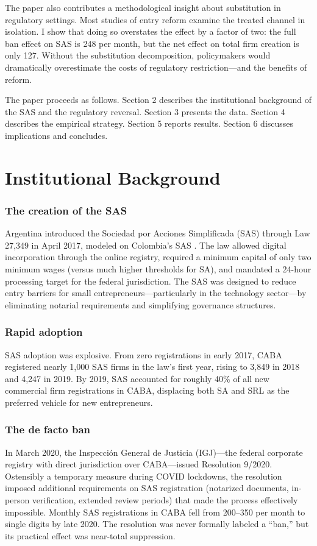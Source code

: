 \documentclass[12pt]{article}
\begin{document}
The paper also contributes a methodological insight about substitution in regulatory settings. Most studies of entry reform examine the treated channel in isolation. I show that doing so overstates the effect by a factor of two: the full ban effect on SAS is 248 per month, but the net effect on total firm creation is only 127. Without the substitution decomposition, policymakers would dramatically overestimate the costs of regulatory restriction---and the benefits of reform.

The paper proceeds as follows. Section 2 describes the institutional background of the SAS and the regulatory reversal. Section 3 presents the data. Section 4 describes the empirical strategy. Section 5 reports results. Section 6 discusses implications and concludes.


\section{Institutional Background}

\subsubsection*{The creation of the SAS} Argentina introduced the Sociedad por Acciones Simplificada (SAS) through Law 27,349 in April 2017, modeled on Colombia's SAS \citep{reyes2010sas}. The law allowed digital incorporation through the online registry, required a minimum capital of only two minimum wages (versus much higher thresholds for SA), and mandated a 24-hour processing target for the federal jurisdiction. The SAS was designed to reduce entry barriers for small entrepreneurs---particularly in the technology sector---by eliminating notarial requirements and simplifying governance structures.

\subsubsection*{Rapid adoption} SAS adoption was explosive. From zero registrations in early 2017, CABA registered nearly 1,000 SAS firms in the law's first year, rising to 3,849 in 2018 and 4,247 in 2019. By 2019, SAS accounted for roughly 40\% of all new commercial firm registrations in CABA, displacing both SA and SRL as the preferred vehicle for new entrepreneurs.

\subsubsection*{The de facto ban} In March 2020, the Inspecci\'on General de Justicia (IGJ)---the federal corporate registry with direct jurisdiction over CABA---issued Resolution 9/2020. Ostensibly a temporary measure during COVID lockdowns, the resolution imposed additional requirements on SAS registration (notarized documents, in-person verification, extended review periods) that made the process effectively impossible. Monthly SAS registrations in CABA fell from 200--350 per month to single digits by late 2020. The resolution was never formally labeled a ``ban,'' but its practical effect was near-total suppression.
\end{document}
